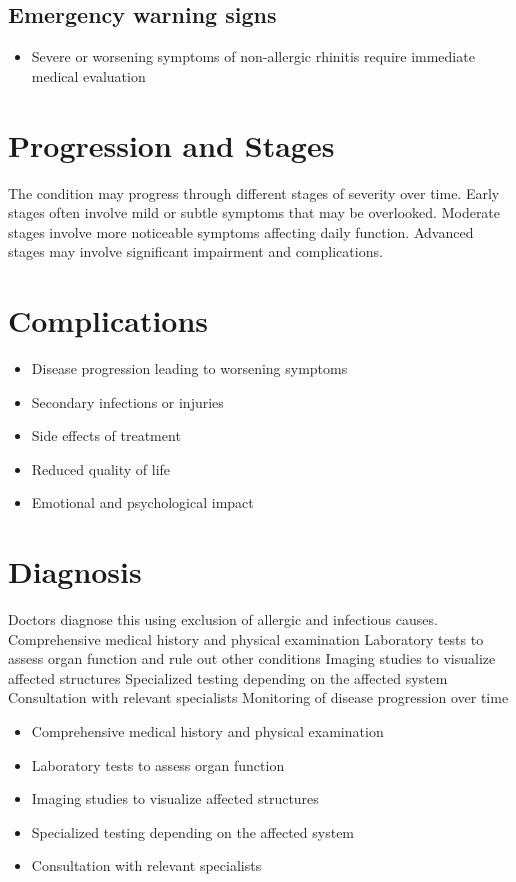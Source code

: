 \subsection{Emergency warning signs}
\begin{itemize}[noitemsep]
  \item Severe or worsening symptoms of non-allergic rhinitis require immediate medical evaluation
\end{itemize}
\section{Progression and Stages}
The condition may progress through different stages of severity over time. Early stages often involve mild or subtle symptoms that may be overlooked. Moderate stages involve more noticeable symptoms affecting daily function. Advanced stages may involve significant impairment and complications.
\section{Complications}
\begin{itemize}[noitemsep]
  \item Disease progression leading to worsening symptoms
  \item Secondary infections or injuries
  \item Side effects of treatment
  \item Reduced quality of life
  \item Emotional and psychological impact
\end{itemize}
\section{Diagnosis}
Doctors diagnose this using exclusion of allergic and infectious causes. Comprehensive medical history and physical examination Laboratory tests to assess organ function and rule out other conditions Imaging studies to visualize affected structures Specialized testing depending on the affected system Consultation with relevant specialists Monitoring of disease progression over time

\begin{itemize}[noitemsep]
  \item Comprehensive medical history and physical examination
  \item Laboratory tests to assess organ function
  \item Imaging studies to visualize affected structures
  \item Specialized testing depending on the affected system
  \item Consultation with relevant specialists
\end{itemize}
